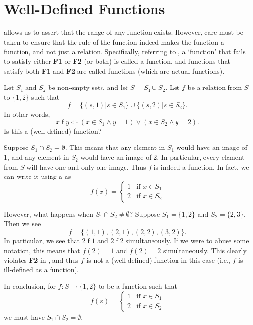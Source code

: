 \section{Well-Defined Functions}
 allows us to assert that the range of any function exists. However, care must be taken to ensure that the rule of the function indeed makes the function a function, and not just a relation. Specifically, referring to , a `function' that fails to satisfy either \textbf{F1} or \textbf{F2} (or both) is called a  function, and functions that satisfy both \textbf{F1} and \textbf{F2} are called  functions (which are actual functions).

\begin{example}
    Let $S_1$ and $S_2$ be non-empty sets, and let $S = S_1 \cup S_2$. Let $f$ be a relation from $S$ to $\{1,2\}$ such that
    \[
        f = \{(s, 1) \vert s \in S_1\} \cup \{(s, 2) \vert s \in S_2\}.
    \]
    In other words,
    \[
        x \mathrel{f} y \iff (x \in S_1 \land y = 1) \lor (x \in S_2 \land y = 2).
    \]
    Is this a (well-defined) function?

    Suppose $S_1 \cap S_2 = \emptyset$. This means that any element in $S_1$ would have an image of 1, and any element in $S_2$ would have an image of 2. In particular, every element from $S$ will have one and only one image. Thus $f$ is indeed a function. In fact, we can write it using a  as
    \[
        f(x) = \begin{cases}
            1 & \text{if } x \in S_1\\
            2 & \text{if } x \in S_2
        \end{cases}
    \]

    However, what happens when $S_1 \cap S_2 \neq \emptyset$? Suppose $S_1 = \{1,2\}$ and $S_2=\{2, 3\}$. Then we see
    \[
        f = \{(1, 1), (2, 1), (2, 2), (3, 2)\}.
    \]
    In particular, we see that $2\mathrel{f}1$ and $2\mathrel{f}2$ simultaneously. If we were to abuse some notation, this means that $f(2) = 1$ and $f(2) = 2$ simultaneously. This clearly violates \textbf{F2} in , and thus $f$ is not a (well-defined) function in this case (i.e., $f$ is ill-defined as a function).

    In conclusion, for $f: S \to \{1,2\}$ to be a function such that
    \[
        f(x) = \begin{cases}
            1 & \text{if } x \in S_1\\
            2 & \text{if } x \in S_2
        \end{cases}
    \]
    we must have $S_1 \cap S_2 = \emptyset$.
\end{example}

